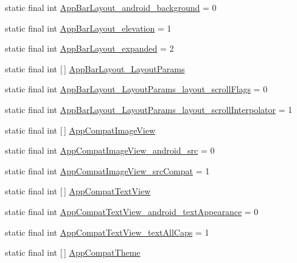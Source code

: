\begin{DoxyCompactItemize}
static final int \hyperlink{classproject4_1_1xaria_1_1R_1_1styleable_a46bcaa19aa31b02b61e87b390eed677b}{App\+Bar\+Layout\+\_\+android\+\_\+background} = 0
\item 
static final int \hyperlink{classproject4_1_1xaria_1_1R_1_1styleable_a19c49765416cea1887a9bc0fbc8d8092}{App\+Bar\+Layout\+\_\+elevation} = 1
\item 
static final int \hyperlink{classproject4_1_1xaria_1_1R_1_1styleable_a1b7cc06243b8bc9ce47a84699605d28b}{App\+Bar\+Layout\+\_\+expanded} = 2
\item 
static final int \mbox{[}$\,$\mbox{]} \hyperlink{classproject4_1_1xaria_1_1R_1_1styleable_ad61d02ae9d1a09e70900bcff9afa224d}{App\+Bar\+Layout\+\_\+\+Layout\+Params}
\item 
static final int \hyperlink{classproject4_1_1xaria_1_1R_1_1styleable_a765b6973ff46793cb361150ce22c3f86}{App\+Bar\+Layout\+\_\+\+Layout\+Params\+\_\+layout\+\_\+scroll\+Flags} = 0
\item 
static final int \hyperlink{classproject4_1_1xaria_1_1R_1_1styleable_a73bbf7a84cde8c331a2578189008a585}{App\+Bar\+Layout\+\_\+\+Layout\+Params\+\_\+layout\+\_\+scroll\+Interpolator} = 1
\item 
static final int \mbox{[}$\,$\mbox{]} \hyperlink{classproject4_1_1xaria_1_1R_1_1styleable_a54846c2740bf432b91663abbcab31165}{App\+Compat\+Image\+View}
\item 
static final int \hyperlink{classproject4_1_1xaria_1_1R_1_1styleable_a15e13bb5555b9754004dda300412ef26}{App\+Compat\+Image\+View\+\_\+android\+\_\+src} = 0
\item 
static final int \hyperlink{classproject4_1_1xaria_1_1R_1_1styleable_a604f27dd13923b0ff25a57688e6688eb}{App\+Compat\+Image\+View\+\_\+src\+Compat} = 1
\item 
static final int \mbox{[}$\,$\mbox{]} \hyperlink{classproject4_1_1xaria_1_1R_1_1styleable_aabfaf2a95fcd2f9933956d90112a5a8a}{App\+Compat\+Text\+View}
\item 
static final int \hyperlink{classproject4_1_1xaria_1_1R_1_1styleable_a529b42ceaf669fb07a434fd12c08787d}{App\+Compat\+Text\+View\+\_\+android\+\_\+text\+Appearance} = 0
\item 
static final int \hyperlink{classproject4_1_1xaria_1_1R_1_1styleable_a6cae197d9bb81d300174304d1eaaa5cd}{App\+Compat\+Text\+View\+\_\+text\+All\+Caps} = 1
\item 
static final int \mbox{[}$\,$\mbox{]} \hyperlink{classproject4_1_1xaria_1_1R_1_1styleable_aad8bec413e2350f9404e6ff0e831a85d}{App\+Compat\+Theme}

\end{DoxyCompactItemize}
